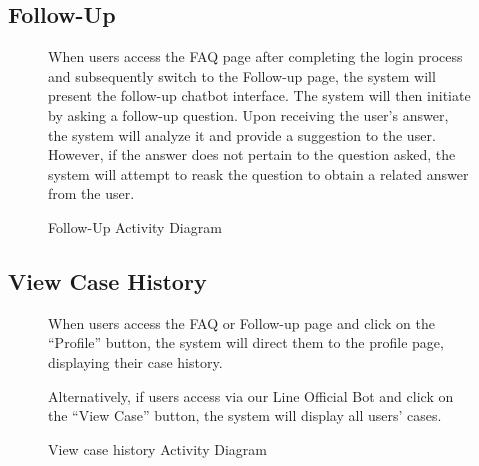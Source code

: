 \documentclass[12pt,oneside,openright,a4paper]{cpe-english-project}
\begin{document}
      \subsection{Follow-Up}
      \begin{figure}[!h]
        \centering
        \caption{Follow-Up Activity Diagram}\label{fig:AD_Follow}
        \begin{justify}
          \qquad When users access the FAQ page after completing the login process and subsequently switch to the Follow-up page, the system will present the follow-up chatbot interface. The system will then initiate by asking a follow-up question. Upon receiving the user’s answer, the system will analyze it and provide a suggestion to the user. However, if the answer does not pertain to the question asked, the system will attempt to reask the question to obtain a related answer from the user.   \par
        \end{justify}
      \end{figure}
\newpage
      \subsection{View Case History}
      \begin{figure}[!h]
        \centering
        \caption{View case history Activity Diagram}\label{fig:AD_ViewCase}
        \begin{justify}
          \qquad When users access the FAQ or Follow-up page and click on the “Profile” button, the system will direct them to the profile page, displaying their case history.  \par
          \qquad Alternatively, if users access via our Line Official Bot and click on the “View Case” button, the system will display all users' cases. \par
        \end{justify}
      \end{figure}
\end{document}
